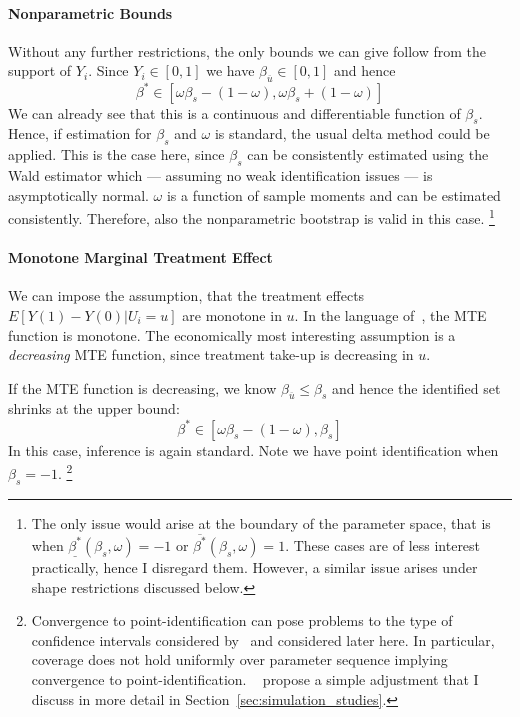 \documentclass[12pt,a4paper,english]{article} %
\numberwithin{equation}{section}
\theoremstyle{definition}
\theoremstyle{remark}
\theoremstyle{plain}
\begin{document}
\paragraph{Nonparametric Bounds}
Without any further restrictions, the only bounds we can give follow from the support of $Y_i$.
Since $Y_i\in[0,1]$ we have $\beta_{\overline{u}} \in [0,1]$ and hence
\begin{equation*}
  \beta^* \in [\omega\beta_s - (1 - \omega), \omega\beta_s + (1 - \omega)]
\end{equation*}
We can already see that this is a continuous and differentiable function of $\beta_s$.
Hence, if estimation for $\beta_s$ and $\omega$ is standard, the usual delta method could be applied.
This is the case here, since $\beta_s$ can be consistently estimated using the Wald estimator which --- assuming no weak identification issues --- is asymptotically normal.
$\omega$ is a function of sample moments and can be estimated consistently.
Therefore, also the nonparametric bootstrap is valid in this case.
\footnote{The only issue would arise at the boundary of the parameter space, that is when $\underline{\beta^*}(\beta_s, \omega)=-1$ or $\overline{\beta^*}(\beta_s, \omega)=1$.
These cases are of less interest practically, hence I disregard them. However, a similar issue arises under shape restrictions discussed below.}

\paragraph{Monotone Marginal Treatment Effect}
We can impose the assumption, that the treatment effects $E[Y(1) - Y(0)|U_i=u]$ are monotone in $u$.
In the language of~\cite{mogstad2018using}, the MTE function is monotone.
The economically most interesting assumption is a \textit{decreasing} MTE function, since treatment take-up is decreasing in $u$.

If the MTE function is decreasing, we know $\beta_{\overline{u}} \leq \beta_s$ and hence the identified set shrinks at the upper bound:
\begin{equation*}
  \beta^* \in [\omega\beta_s - (1 - \omega), \beta_s]
\end{equation*}
In this case, inference is again standard. Note we have point identification when $\beta_s=-1$.
\footnote{Convergence to point-identification can pose problems to the type of confidence intervals considered by~\cite{imbens2004confidence} and considered later here.
In particular, coverage does not hold uniformly over parameter sequence implying convergence to point-identification.
~\cite{imbens2004confidence} propose a simple adjustment that I discuss in more detail in Section~\ref{sec:simulation_studies}.}
\end{document}
